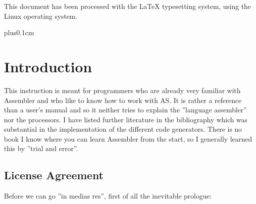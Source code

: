 \documentclass[12pt,twoside]{report}
\newcommand{\asname}{{AS}}
\begin{document}
This document has been processed with the LaTeX typesetting system, using
the Linux operating system.

\clearpage


{\parskip 0cm plus0.1cm \tableofcontents}


\cleardoublepage
\chapter{Introduction}

This instruction is meant for programmers who are already very familiar
with Assembler and who like to know how to work with \asname{}.  It is rather a
reference than a user's manual and so it neither tries to explain the
''language assembler'' nor the processors.  I have listed further
literature in the bibliography which was substantial in the implementation
of the different code generators.  There is no book I know where you can
learn Assembler from the start, so I generally learned this by ''trial and
error''.



\section{License Agreement}
\label{SectLicense}

Before we can go ''in medias res'', first of all the inevitable prologue:
\end{document}
